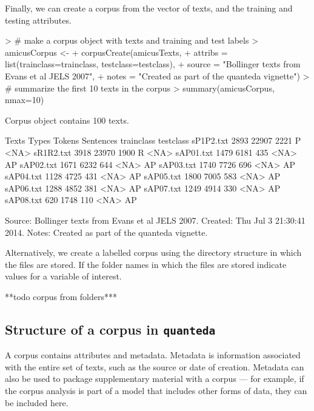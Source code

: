 \documentclass[11pt]{article}
\begin{document}
Finally, we can create a corpus from the vector of texts, and the training and testing attributes.

\begin{Schunk}
\begin{Sinput}
> # make a corpus object with texts and training and test labels
> amicusCorpus <- 
+   corpusCreate(amicusTexts, 
+                attribs = list(trainclass=trainclass, testclass=testclass),
+                source = "Bollinger texts from Evans et al JELS 2007",
+                notes = "Created as part of the quanteda vignette")
> # summarize the first 10 texts in the corpus
> summary(amicusCorpus, nmax=10)
\end{Sinput}
\begin{Soutput}
Corpus object contains 100 texts.

     Texts Types Tokens Sentences trainclass testclass
 sP1P2.txt  2893  22907      2221          P      <NA>
 sR1R2.txt  3918  23970      1900          R      <NA>
 sAP01.txt  1479   6181       435       <NA>        AP
 sAP02.txt  1671   6232       644       <NA>        AP
 sAP03.txt  1740   7726       696       <NA>        AP
 sAP04.txt  1128   4725       431       <NA>        AP
 sAP05.txt  1800   7005       583       <NA>        AP
 sAP06.txt  1288   4852       381       <NA>        AP
 sAP07.txt  1249   4914       330       <NA>        AP
 sAP08.txt   620   1748       110       <NA>        AP

Source:  Bollinger texts from Evans et al JELS 2007.
Created: Thu Jul  3 21:30:41 2014.
Notes:   Created as part of the quanteda vignette.
\end{Soutput}
\end{Schunk}

Alternatively, we create a labelled corpus using the directory structure in which the files are stored. If the folder names in which the files are stored indicate values for a variable of interest.

**todo corpus from folders***

\subsection{Structure of a corpus in \texttt{quanteda}}
A corpus contains attributes and metadata. Metadata is information associated with the entire set of texts, such as the source or date of creation. Metadata can also be used to package supplementary material with a corpus --- for example, if the corpus analysis is part of a model that includes other forms of data, they can be included here.
\end{document}
